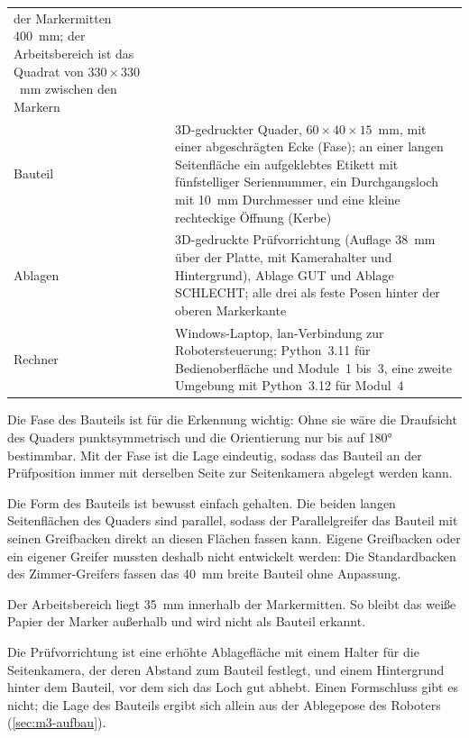 \begin{table}[htbp]
\begin{tabularx}{\textwidth}{@{}lX@{}}
              der Markermitten \SI{400}{\milli\metre}; der Arbeitsbereich ist das Quadrat von
              $330 \times 330$~\si{\milli\metre} zwischen den Markern \\
    Bauteil & 3D-gedruckter Quader, $60 \times 40 \times 15$~\si{\milli\metre}, mit einer abgeschrägten
              Ecke (Fase); an einer langen Seitenfläche ein aufgeklebtes Etikett mit
              fünfstelliger Seriennummer, ein Durchgangsloch mit \SI{10}{\milli\metre}
              Durchmesser und eine kleine rechteckige Öffnung (Kerbe) \\
    Ablagen & 3D-gedruckte Prüfvorrichtung (Auflage \SI{38}{\milli\metre} über der
              Platte, mit Kamerahalter und Hintergrund), Ablage GUT und Ablage SCHLECHT; alle drei als feste Posen hinter der
              oberen Markerkante \\
    Rechner & Windows-Laptop, \ac{lan}-Verbindung zur Robotersteuerung; Python~3.11 für
              Bedienoberfläche und Module~1 bis~3, eine zweite Umgebung mit Python~3.12 für
              Modul~4 \\
    \bottomrule
  \end{tabularx}
\end{table}

Die Fase des Bauteils ist für die Erkennung wichtig: Ohne sie wäre die Draufsicht des
Quaders punktsymmetrisch und die Orientierung nur bis auf \ang{180} bestimmbar. Mit der
Fase ist die Lage eindeutig, sodass das Bauteil an der Prüfposition immer mit derselben
Seite zur Seitenkamera abgelegt werden kann.

Die Form des Bauteils ist bewusst einfach gehalten. Die beiden langen Seitenflächen des
Quaders sind parallel, sodass der Parallelgreifer das Bauteil mit seinen Greifbacken direkt
an diesen Flächen fassen kann. Eigene Greifbacken oder ein eigener Greifer mussten deshalb
nicht entwickelt werden: Die Standardbacken des Zimmer-Greifers fassen das
\SI{40}{\milli\metre} breite Bauteil ohne Anpassung.

Der Arbeitsbereich liegt \SI{35}{\milli\metre} innerhalb der Markermitten. So bleibt das
weiße Papier der Marker außerhalb und wird nicht als Bauteil erkannt.

Die Prüfvorrichtung ist eine erhöhte Ablagefläche mit einem Halter für die Seitenkamera, der
deren Abstand zum Bauteil festlegt, und einem Hintergrund hinter dem Bauteil, vor dem sich das
Loch gut abhebt. Einen Formschluss gibt es nicht; die Lage des Bauteils ergibt sich allein aus
der Ablegepose des Roboters (\cref{sec:m3-aufbau}).

